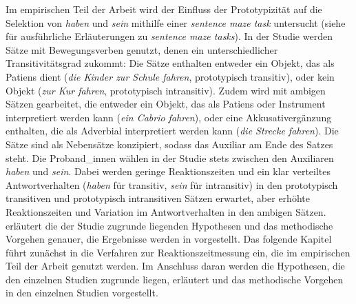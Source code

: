 Im empirischen Teil der Arbeit wird der Einfluss der Prototypizität auf die Selektion von \textit{haben} und \textit{sein} mithilfe einer \textit{sentence maze task} untersucht (siehe  für ausführliche Erläuterungen zu \textit{sentence maze tasks}). In der Studie werden Sätze mit Bewegungsverben genutzt, denen ein unterschiedlicher Transitivitätsgrad zukommt: Die Sätze enthalten entweder ein Objekt, das als Patiens dient (\textit{die Kinder zur Schule fahren}, prototypisch transitiv), oder kein Objekt (\textit{zur Kur fahren}, prototypisch intransitiv). Zudem wird mit ambigen Sätzen gearbeitet, die entweder ein Objekt, das als Patiens oder Instrument interpretiert werden kann (\textit{ein Cabrio fahren}), oder eine Akkusativergänzung enthalten, die als Adverbial interpretiert werden kann (\textit{die Strecke fahren}). Die Sätze sind als Nebensätze konzipiert, sodass das Auxiliar am Ende des Satzes steht. Die Proband\_innen wählen in der Studie stets zwischen den Auxiliaren \textit{haben} und \textit{sein}. Dabei werden geringe Reaktionszeiten und ein klar verteiltes Antwortverhalten (\textit{haben} für transitiv, \textit{sein} für intransitiv) in den prototypisch transitiven und prototypisch intransitiven Sätzen erwartet, aber erhöhte Reaktionszeiten und Variation im Antwortverhalten in den ambigen Sätzen.  erläutert die der Studie zugrunde liegenden Hypothesen und das methodische Vorgehen genauer, die Ergebnisse werden in  vorgestellt. Das folgende Kapitel führt zunächst in die Verfahren zur Reaktionszeitmessung ein, die im empirischen Teil der Arbeit genutzt werden. Im Anschluss daran werden die Hypothesen, die den einzelnen Studien zugrunde liegen, erläutert und das methodische Vorgehen in den einzelnen Studien vorgestellt.
